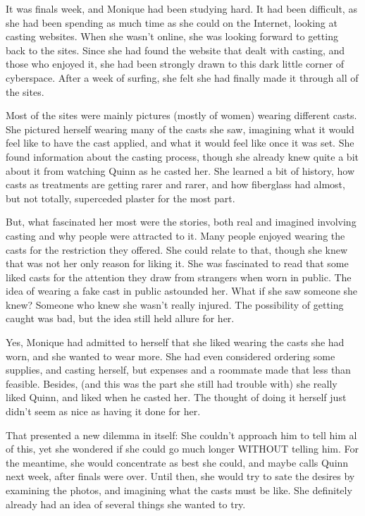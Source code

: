 \begin{thought}
It was finals week, and Monique had been studying hard. It had been difficult, as she had
been spending as much time as she could on the Internet, looking at casting websites. When she
wasn't online, she was looking forward to getting back to the sites. Since she had found the
website that dealt with casting, and those who enjoyed it, she had been strongly drawn to this
dark little corner of cyberspace. After a week of surfing, she felt she had finally made it
through all of the sites.

Most of the sites were mainly pictures (mostly of women) wearing different casts. She
pictured herself wearing many of the casts she saw, imagining what it would feel like to have
the cast applied, and what it would feel like once it was set. She found information about the
casting process, though she already knew quite a bit about it from watching Quinn as he casted
her. She learned a bit of history, how casts as treatments are getting rarer and rarer, and how
fiberglass had almost, but not totally, superceded plaster for the most part.

But, what fascinated her most were the stories, both real and imagined involving casting and
why people were attracted to it. Many people enjoyed wearing the casts for the restriction they
offered. She could relate to that, though she knew that was not her only reason for liking it.
She was fascinated to read that some liked casts for the attention they draw from strangers when
worn in public. The idea of wearing a fake cast in public astounded her. What if she saw someone
she knew? Someone who knew she wasn't really injured. The possibility of getting caught was bad,
but the idea still held allure for her.

Yes, Monique had admitted to herself that she liked wearing the casts she had worn, and she
wanted to wear more. She had even considered ordering some supplies, and casting herself, but
expenses and a roommate made that less than feasible. Besides, (and this was the part she still
had trouble with) she really liked Quinn, and liked when he casted her. The thought of doing it
herself just didn't seem as nice as having it done for her.

That presented a new dilemma in itself: She couldn't approach him to tell him al of this,
yet she wondered if she could go much longer WITHOUT telling him. For the meantime, she would
concentrate as best she could, and maybe calls Quinn next week, after finals were over. Until
then, she would try to sate the desires by examining the photos, and imagining what the casts
must be like. She definitely already had an idea of several things she wanted to try.
\end{thought}

